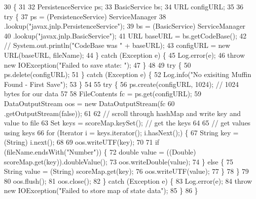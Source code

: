 \begin{DoxyCode}
30                                                                                \{
31 
32         PersistenceService ps;
33         BasicService bs;
34         URL configURL;
35 
36         \textcolor{keywordflow}{try} \{
37             ps = (PersistenceService) ServiceManager
38                     .lookup(\textcolor{stringliteral}{"javax.jnlp.PersistenceService"});
39             bs = (BasicService) ServiceManager
40                     .lookup(\textcolor{stringliteral}{"javax.jnlp.BasicService"});
41             URL baseURL = bs.getCodeBase();
42             \textcolor{comment}{// System.out.println("CodeBase was " + baseURL);}
43             configURL = \textcolor{keyword}{new} URL(baseURL, fileName);
44         \} \textcolor{keywordflow}{catch} (Exception e) \{
45             Log.error(e);
46             \textcolor{keywordflow}{throw} \textcolor{keyword}{new} IOException(\textcolor{stringliteral}{"Failed to save state: "});
47         \}
48 
49         \textcolor{keywordflow}{try} \{
50             ps.delete(configURL);
51         \} \textcolor{keywordflow}{catch} (Exception e) \{
52             Log.info(\textcolor{stringliteral}{"No exisiting Muffin Found - First Save"});
53         \}
54         
55         \textcolor{keywordflow}{try} \{
56             ps.create(configURL, 1024); \textcolor{comment}{// 1024 bytes for our data}
57 
58             FileContents fc = ps.get(configURL);
59             DataOutputStream oos = \textcolor{keyword}{new} DataOutputStream(fc
60                     .getOutputStream(\textcolor{keyword}{false}));
61 
62             \textcolor{comment}{// scroll through hashMap and write key and value to file}
63             Set keys = scoreMap.keySet(); \textcolor{comment}{// get the keys}
64 
65             \textcolor{comment}{// get values using keys}
66             \textcolor{keywordflow}{for} (Iterator i = keys.iterator(); i.hasNext();) \{
67                 String key = (String) i.next();
68 
69                 oos.writeUTF(key);
70 
71                 \textcolor{keywordflow}{if} (fileName.endsWith(\textcolor{stringliteral}{"Number"})) \{
72                     \textcolor{keywordtype}{double} value = ((Double) scoreMap.get(key)).doubleValue();
73                     oos.writeDouble(value);
74                 \} \textcolor{keywordflow}{else} \{
75                     String value = (String) scoreMap.get(key);
76                     oos.writeUTF(value);
77                 \}
78             \}
79 
80             oos.flush();
81             oos.close();
82         \} \textcolor{keywordflow}{catch} (Exception e) \{
83             Log.error(e);
84             \textcolor{keywordflow}{throw} \textcolor{keyword}{new} IOException(\textcolor{stringliteral}{"Failed to store map of state data"});
85         \}
86     \}
\end{DoxyCode}
